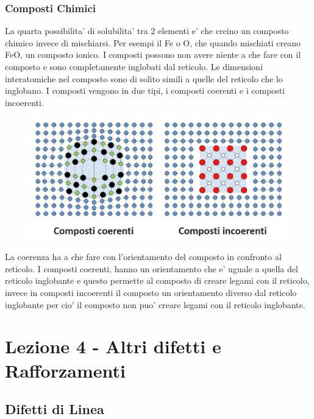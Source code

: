 \documentclass{article}
\begin{document}
        \subsubsection{Composti Chimici}
            La quarta possibilita' di solubilita' tra 2 elementi e' che creino un composto chimico invece di mischiarsi.
            Per esempi il Fe o O, che quando mischiati creano FeO, un composto ionico.
            I composti possono non avere niente a che fare con il composto e sono completamente inglobati dal reticolo. 
            Le dimensioni interatomiche nel composto sono di solito simili a quelle del reticolo che lo inglobano.
            \newline \newline I composti vengono in due tipi, i composti coerenti e i composti incoerenti.
            \begin{figure}
                \centering
                \includegraphics[width=.85\linewidth]{Tipi di Composti.png}
            \end{figure}
            La coerenza ha a che fare con l'orientamento del composto in confronto al reticolo. I composti coerenti, hanno un orientamento che e' uguale a quella del 
            reticolo inglobante e questo permette al composto di creare legami con il reticolo, invece in composti incoerenti il composto un orientamento diverso dal 
            reticolo inglobante per cio' il composto non puo' creare legami con il reticolo inglobante.
    \section{Lezione 4 - Altri difetti e Rafforzamenti}
        \subsection{Difetti di Linea}
\end{document}
